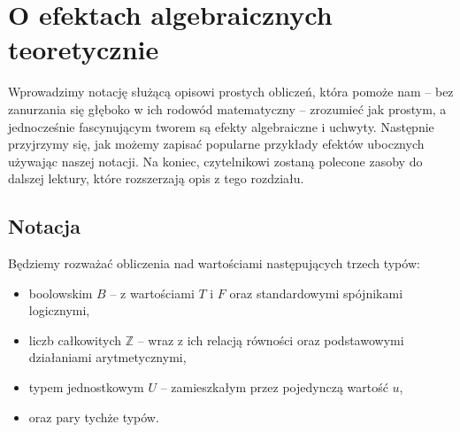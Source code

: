 
\chapter{O efektach algebraicznych teoretycznie}

Wprowadzimy notację służącą opisowi prostych obliczeń, która pomoże nam -- bez zanurzania się głęboko w ich rodowód matematyczny -- zrozumieć jak prostym, a jednocześnie fascynującym tworem są efekty algebraiczne i uchwyty. Następnie przyjrzymy się, jak możemy zapisać popularne przykłady efektów ubocznych używając naszej notacji. Na koniec, czytelnikowi zostaną polecone zasoby do dalszej lektury, które rozszerzają opis z tego rozdziału.

\section{Notacja}

\newcommand{\return}[1]{\mathbf{return}\ #1}
\newcommand{\op}[3]{#1(#2, #3)}
\newcommand{\opi}[3]{\op{op_{#1}}{#2}{#3}}
\newcommand{\handle}[2]{\mathbf{handle}\ #1\ \mathbf{with}\ #2}
\newcommand{\hcase}[3]{#1\ #2\ \Rightarrow\ #3}
\newcommand{\fun}[2]{\lambda #1.\ #2}
\newcommand{\eval}[1]{\llbracket\, #1\, \rrbracket}
\newcommand{\cond}[3]{\mathbf{if}\ #1\ \mathbf{then}\ #2\ \mathbf{else}\ #3}

Będziemy rozważać obliczenia nad wartościami następujących trzech typów:
\begin{itemize}
\item boolowskim \(B\) -- z wartościami \(T\) i \(F\) oraz standardowymi spójnikami logicznymi,
\item liczb całkowitych \(\mathbb{Z}\) -- wraz z ich relacją równości oraz podstawowymi działaniami arytmetycznymi,
\item typem jednostkowym \(U\) -- zamieszkałym przez pojedynczą wartość \(u\),
\item oraz pary tychże typów.
\end{itemize}

% 
% 

